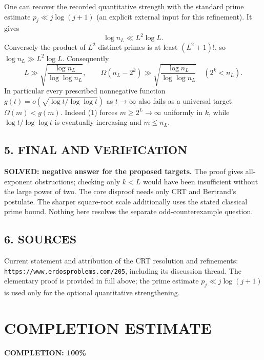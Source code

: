 One can recover the recorded quantitative strength with the standard prime estimate $p_j\ll j\log(j+1)$ (an explicit external input for this refinement). It gives
\[
 \log n_L\ll L^2\log L.
\]
Conversely the product of $L^2$ distinct primes is at least $(L^2+1)!$, so $\log n_L\gg L^2\log L$. Consequently
\[
 L\gg\sqrt{\frac{\log n_L}{\log\log n_L}},\qquad
 \Omega(n_L-2^k)\gg\sqrt{\frac{\log n_L}{\log\log n_L}}
 \quad(2^k<n_L).
\]
In particular every prescribed nonnegative function
$g(t)=o(\sqrt{\log t/\log\log t})$ as $t\to\infty$ also fails as a universal target $\Omega(m)<g(m)$. Indeed (1) forces $m\ge2^L\to\infty$ uniformly in $k$, while $\log t/\log\log t$ is eventually increasing and $m\le n_L$.
\subsection*{5. FINAL AND VERIFICATION}
\textbf{SOLVED: negative answer for the proposed targets.}
The proof gives all-exponent obstructions; checking only $k<L$ would have been insufficient without the large power of two. The core disproof needs only CRT and Bertrand's postulate. The sharper square-root scale additionally uses the stated classical prime bound. Nothing here resolves the separate odd-counterexample question.
\subsection*{6. SOURCES}
Current statement and attribution of the CRT resolution and refinements: \texttt{https://www.erdosproblems.com/205}, including its discussion thread. The elementary proof is provided in full above; the prime estimate $p_j\ll j\log(j+1)$ is used only for the optional quantitative strengthening.
\section{COMPLETION ESTIMATE}
\textbf{COMPLETION: 100\%}
